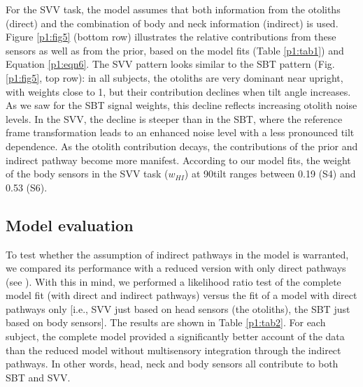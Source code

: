 For the SVV task, the model assumes that both information from the otoliths (direct) and the combination of body and neck information (indirect) is used. Figure \ref{p1:fig5} (bottom row) illustrates the relative contributions from these sensors as well as from the prior, based on the model fits (Table \ref{p1:tab1}) and Equation \ref{p1:eqn6}. The SVV pattern looks similar to the SBT pattern (Fig. \ref{p1:fig5}, top row): in all subjects, the otoliths are very dominant near upright, with weights close to 1, but their contribution declines when tilt angle increases. As we saw for the SBT signal weights, this decline reflects increasing otolith noise levels. In the SVV, the decline is steeper than in the SBT, where the reference frame transformation leads to an enhanced noise level with a less pronounced tilt dependence. As the otolith contribution decays, the contributions of the prior and indirect pathway become more manifest. According to our model fits, the weight of the body sensors in the SVV task ($w_{HI}$) at 90\mydegree tilt ranges between 0.19 (S4) and 0.53 (S6). 

\subsection{Model evaluation}
 
To test whether the assumption of indirect pathways in the model is warranted, we compared its performance with a reduced version with only direct pathways (see ). With this in mind, we performed a likelihood ratio test of the complete model fit (with direct and indirect pathways) versus the fit of a model with direct pathways only [i.e., SVV just based on head sensors (the otoliths), the SBT just based on body sensors]. The results are shown in Table \ref{p1:tab2}. For each subject, the complete model provided a significantly better account of the data than the reduced model without multisensory integration through the indirect pathways. In other words, head, neck and body sensors all contribute to both SBT and SVV. 

